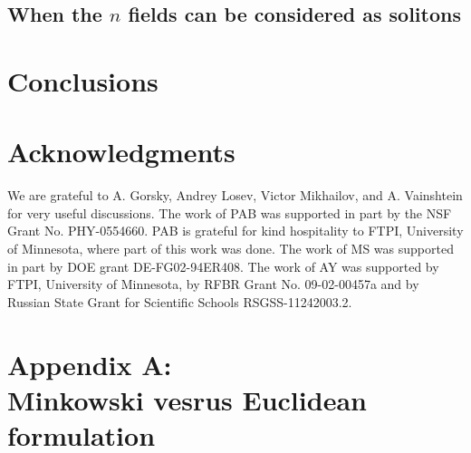 \documentclass[epsfig,12pt]{article}
\renewcommand{\theequation}{\thesection.\arabic{equation}}
\renewcommand{\theequation}{\thesection.\arabic{equation}}
\begin{document}
{\subsection{When the $n$ fields can be considered as solitons}


\newpage

\section{Conclusions}


\section*{Acknowledgments}

We are grateful to A. Gorsky, Andrey Losev, Victor Mikhailov, and A. Vainshtein 
for very useful discussions.
The work of PAB was supported in part by the NSF Grant No. PHY-0554660. 
PAB is grateful for kind hospitality to FTPI, University of Minnesota, where part of this work was done. 
The work of MS was supported in part by DOE grant DE-FG02-94ER408. 
The work of AY was  supported 
by  FTPI, University of Minnesota, 
by RFBR Grant No. 09-02-00457a 
and by Russian State Grant for 
Scientific Schools RSGSS-11242003.2.




\newpage

\section*{Appendix A: \\
Minkowski vesrus Euclidean formulation}
 \renewcommand{\theequation}{A.\arabic{equation}}
\setcounter{equation}{0}
 
 \renewcommand{\thesubsection}{A.\arabic{subsection}}
\setcounter{subsection}{0}

}
\end{document}
